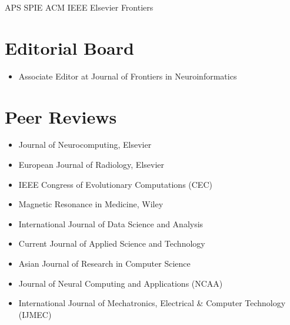 \documentclass[]{template}
\begin{document}
APS \textbullet{}  SPIE \textbullet{} ACM \textbullet{} IEEE \textbullet{} Elsevier \textbullet{} Frontiers



\sectionsep
\hline
\sectionsep

\section{Editorial Board} 
\begin{itemize}
\item Associate Editor at Journal of Frontiers in Neuroinformatics
\end{itemize}

\section{Peer Reviews}
\begin{itemize}
\item Journal of Neurocomputing, Elsevier
\item European Journal of Radiology, Elsevier
\item IEEE Congress of Evolutionary Computations (CEC)
\item Magnetic Resonance in Medicine, Wiley
\item International Journal of Data Science and Analysis
\item Current Journal of Applied Science and Technology
\item Asian Journal of Research in Computer Science
\item Journal of Neural Computing and Applications (NCAA)
\item International Journal of Mechatronics, Electrical \& Computer Technology (IJMEC)
\end{itemize}
\end{document}
